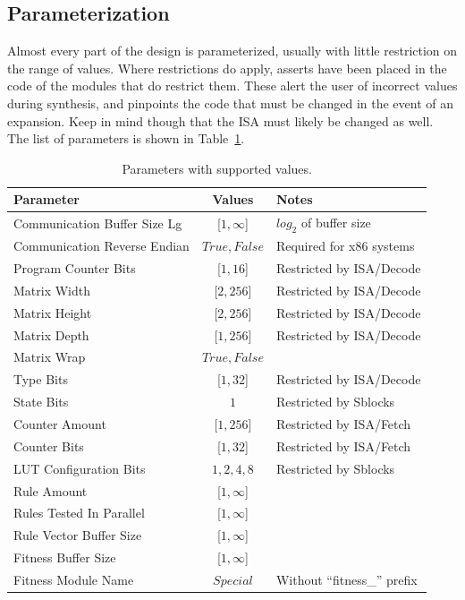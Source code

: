 \subsection{Parameterization}

Almost every part of the design is parameterized, usually with little restriction on the range of values.
Where restrictions do apply, asserts have been placed in the code of the modules that do restrict them.
These alert the user of incorrect values during synthesis, and pinpoints the code that must be changed in the event of an expansion.
Keep in mind though that the ISA must likely be changed as well.
The list of parameters is shown in Table~\ref{tab:parameters}.

\begin{table}[!ht]
    \renewcommand{\arraystretch}{1.3}
    \centering
    \begin{tabular}{l|c|l}
        \bfseries Parameter & \bfseries Values & \bfseries Notes \\
        \hline
        Communication Buffer Size Lg & [$1,\infty$] & $log_2$ of buffer size \\
        Communication Reverse Endian & $True,False$ & Required for x86 systems \\
        Program Counter Bits         & [$1,16$]     & Restricted by ISA/Decode \\
        Matrix Width                 & [$2,256$]    & Restricted by ISA/Decode \\
        Matrix Height                & [$2,256$]    & Restricted by ISA/Decode \\
        Matrix Depth                 & [$1,256$]    & Restricted by ISA/Decode \\
        Matrix Wrap                  & $True,False$ & \\
        Type Bits                    & [$1,32$]     & Restricted by ISA/Decode \\
        State Bits                   & $1$          & Restricted by Sblocks \\
        Counter Amount               & [$1,256$]    & Restricted by ISA/Fetch \\
        Counter Bits                 & [$1,32$]     & Restricted by ISA/Fetch \\
        LUT Configuration Bits       & $1,2,4,8$    & Restricted by Sblocks \\
        Rule Amount                  & [$1,\infty$] & \\
        Rules Tested In Parallel     & [$1,\infty$] & \\
        Rule Vector Buffer Size      & [$1,\infty$] & \\
        Fitness Buffer Size          & [$1,\infty$] & \\
        Fitness Module Name          & $Special$    & Without ``fitness\_'' prefix \\
    \end{tabular}
    \caption[Parameters.]{Parameters with supported values.}
    \label{tab:parameters}
\end{table}

